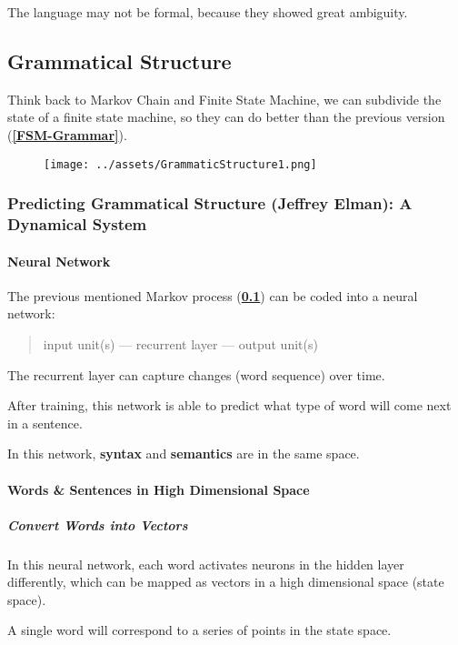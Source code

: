 \documentclass[a4paper, openany]{book}
\begin{document}
The language may not be formal, because they showed great ambiguity.

\subsection{Grammatical Structure}\label{FSM-Grammar2}

Think back to Markov Chain and Finite State Machine, we can subdivide the state of a finite state machine, so they can do better than the previous version (\textbf{\cref{FSM-Grammar}}).

\begin{figure}[htbp]
  \centering
  \texttt{[image: ../assets/GrammaticStructure1.png]}
\end{figure}

\subsubsection{Predicting Grammatical Structure (Jeffrey Elman): A Dynamical System}

\paragraph{Neural Network}

The previous mentioned Markov process (\textbf{\cref{FSM-Grammar2}}) can be coded into a neural network:

\begin{quote}
  input unit(s) --- recurrent layer --- output unit(s)
\end{quote}

The recurrent layer can capture changes (word sequence) over time.

After training, this network is able to predict what type of word will come next in a sentence.

In this network, \textbf{syntax} and \textbf{semantics} are in the same space.

\paragraph{Words \& Sentences in High Dimensional Space}

\subparagraph{Convert Words into Vectors}

In this neural network, each word activates neurons in the hidden layer differently, which can be mapped as vectors in a high dimensional space (state space).

A single word will correspond to a series of points in the state space.
\end{document}
